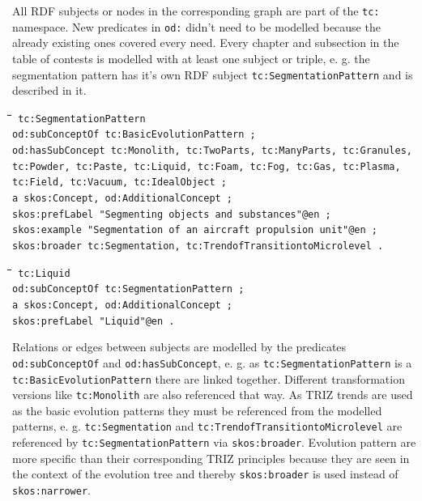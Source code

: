 \documentclass[11pt,a4paper]{article}
\newenvironment{code}{\tt \begin{tabbing}
\hskip12pt\=\hskip12pt\=\hskip12pt\=\hskip12pt\=\hskip5cm\=\hskip5cm\=\kill}
{\end{tabbing}}
\begin{document}
All RDF subjects or nodes in the corresponding graph are part of the
\texttt{tc:} namespace. New predicates in \texttt{od:} didn't need to be
modelled because the already existing ones covered every need. Every chapter
and subsection in the table of contests is modelled with at least one subject
or triple, e. g. the segmentation pattern has it's own RDF subject
\texttt{tc:SegmentationPattern} and is described in it.

\begin{code}\tt
tc:SegmentationPattern \\
\> od:subConceptOf tc:BasicEvolutionPattern ; \\
\> od:hasSubConcept tc:Monolith, tc:TwoParts, tc:ManyParts, tc:Granules, \\
\> tc:Powder, tc:Paste, tc:Liquid, tc:Foam, tc:Fog, tc:Gas, tc:Plasma, \\
\> tc:Field, tc:Vacuum, tc:IdealObject ; \\
\> a skos:Concept, od:AdditionalConcept ; \\
\> skos:prefLabel "Segmenting objects and substances"@en ; \\
\> skos:example "Segmentation of an aircraft propulsion unit"@en ; \\
\> skos:broader tc:Segmentation, tc:TrendofTransitiontoMicrolevel .
\end{code}

\begin{code}\tt
tc:Liquid \\
\> od:subConceptOf tc:SegmentationPattern ; \\
\> a skos:Concept, od:AdditionalConcept ; \\
\> skos:prefLabel "Liquid"@en . \\
\end{code}

Relations or edges between subjects are modelled by the predicates
\texttt{od:subConceptOf} and \texttt{od:hasSubConcept}, e. g. as
\texttt{tc:SegmentationPattern} is a \texttt{tc:BasicEvolutionPattern} there
are linked together. Different transformation versions like
\texttt{tc:Monolith} are also referenced that way. As TRIZ trends are used as
the basic evolution patterns they must be referenced from the modelled
patterns, e. g. \texttt{tc:Segmentation} and
\texttt{tc:TrendofTransitiontoMicrolevel} are referenced by
\texttt{tc:SegmentationPattern} via \texttt{skos:broader}. Evolution pattern
are more specific than their corresponding TRIZ principles because they are
seen in the context of the evolution tree and thereby \texttt{skos:broader} is
used instead of \texttt{skos:narrower}.  
\end{document}

